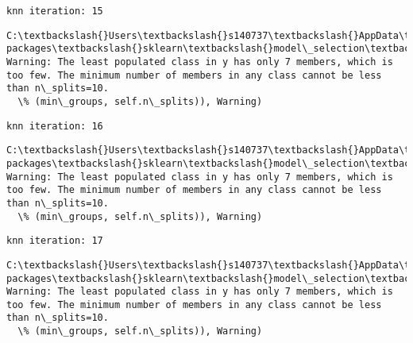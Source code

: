 \documentclass[11pt]{article}
\begin{document}
    \begin{Verbatim}[commandchars=\\\{\}]
knn iteration: 15 

    \end{Verbatim}

    \begin{Verbatim}[commandchars=\\\{\}]
C:\textbackslash{}Users\textbackslash{}s140737\textbackslash{}AppData\textbackslash{}Local\textbackslash{}Continuum\textbackslash{}anaconda3\textbackslash{}lib\textbackslash{}site-packages\textbackslash{}sklearn\textbackslash{}model\_selection\textbackslash{}\_split.py:605: Warning: The least populated class in y has only 7 members, which is too few. The minimum number of members in any class cannot be less than n\_splits=10.
  \% (min\_groups, self.n\_splits)), Warning)

    \end{Verbatim}

    \begin{Verbatim}[commandchars=\\\{\}]
knn iteration: 16 

    \end{Verbatim}

    \begin{Verbatim}[commandchars=\\\{\}]
C:\textbackslash{}Users\textbackslash{}s140737\textbackslash{}AppData\textbackslash{}Local\textbackslash{}Continuum\textbackslash{}anaconda3\textbackslash{}lib\textbackslash{}site-packages\textbackslash{}sklearn\textbackslash{}model\_selection\textbackslash{}\_split.py:605: Warning: The least populated class in y has only 7 members, which is too few. The minimum number of members in any class cannot be less than n\_splits=10.
  \% (min\_groups, self.n\_splits)), Warning)

    \end{Verbatim}

    \begin{Verbatim}[commandchars=\\\{\}]
knn iteration: 17 

    \end{Verbatim}

    \begin{Verbatim}[commandchars=\\\{\}]
C:\textbackslash{}Users\textbackslash{}s140737\textbackslash{}AppData\textbackslash{}Local\textbackslash{}Continuum\textbackslash{}anaconda3\textbackslash{}lib\textbackslash{}site-packages\textbackslash{}sklearn\textbackslash{}model\_selection\textbackslash{}\_split.py:605: Warning: The least populated class in y has only 7 members, which is too few. The minimum number of members in any class cannot be less than n\_splits=10.
  \% (min\_groups, self.n\_splits)), Warning)

    \end{Verbatim}
\end{document}
